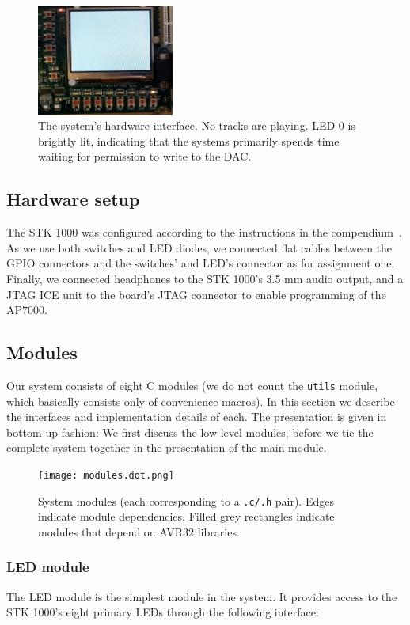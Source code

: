 \documentclass[a4paper,9pt]{article}
\begin{document}
\begin{figure}[!h]
    \centering
    \includegraphics[width=0.4\textwidth]{stk1000_interface.png}
    \caption{The system's hardware interface. No tracks are playing. LED 0 is
    brightly lit, indicating that the systems primarily spends time waiting
    for permission to write to the DAC.}
    \label{fig:interface}
\end{figure}


\subsection{Hardware setup}
\label{sec:hwsetup}
The STK 1000 was configured according to the instructions in the
compendium~\cite[p. 50]{compendium}. As we use both switches and LED diodes,
we connected flat cables between the GPIO connectors and the switches' and
LED's connector as for assignment one. Finally, we connected headphones to the
STK 1000's 3.5 mm audio output, and a JTAG ICE unit to the board's JTAG
connector to enable programming of the AP7000.


\subsection{Modules}
\label{sec:modules}
Our system consists of eight C modules (we do not count the \texttt{utils}
module, which basically consists only of convenience macros). In this section
we describe the interfaces and implementation details of each. The
presentation is given in bottom-up fashion: We first discuss the low-level
modules, before we tie the complete system together in the presentation of the
main module.

\begin{figure}[h!]
    \centering
    \texttt{[image: modules.dot.png]}
    \caption{System modules (each corresponding to a \texttt{.c/.h}
    pair). Edges indicate module dependencies. Filled grey rectangles indicate
    modules that depend on AVR32 libraries.}
\end{figure}


\subsubsection{LED module}
The LED module is the simplest module in the system.
It provides access to the STK 1000's eight primary LEDs through the following
interface:
\end{document}
